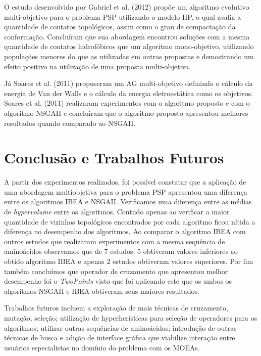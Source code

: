 \documentclass[conference]{IEEEtran}
\begin{document}
O estudo desenvolvido por Gabriel et al. (2012) \cite{gabriel2012algoritmos} propõe um algoritmo evolutivo multi-objetivo para o problema PSP utilizando o modelo HP, o qual avalia a
quantidade de contatos topológicos, assim como o grau de
compactação da conformação. Concluíram que sua abordagem
encontrou soluções com a mesma quantidade de contatos
hidrofóbicos que um algoritmo mono-objetivo, utilizando
populações menores do que as utilizadas em outras propostas
e demostrando um efeito positivo na utilização
de uma proposta multi-objetiva.

Já Soares et al. (2011) \cite{soares2011investigating} propuseram um AG multi-objetivo definindo o cálculo da energia de Van der Walls e o cálculo da energia eletroestática como os objetivos. Soares et al. (2011) realizaram experimentos com o algoritmo proposto e com o algoritmo NSGAII \cite{deb2002fast} e concluiram que o algoritmo proposto apresentou melhores resultados quando comparado ao NSGAII. 




\section{Conclusão e Trabalhos Futuros}

A partir dos experimentos realizados, foi possível constatar
que a aplicação de uma abordagem multiobjetiva para o problema PSP apresentou uma diferença entre os algoritmos IBEA e NSGAII. Verificamos uma diferença entre as médias de \textit{hypervolume} entre os algoritmos. Contudo apenas ao verificar a maior quantidade de vizinhos topológicos encontrados por cada algoritmo ficou nítida a diferença no desempenho dos algoritmos. Ao comparar o algoritmo IBEA com outros estudos que realizaram experimentos com a mesma sequência de aminoácidos observamos que de 7 estudos: 5 obtiveram valores inferiores ao obtido algoritmo IBEA e apenas 2 estudos obtiveram valores superiores. Por fim também concluímos que operador de cruzamento que apresentou melhor desempenho foi o \textit{TwoPoints} visto que foi aplicando este que os ambos os algoritmos NSGAII e IBEA obtiveram seus maiores resultados. 

Trabalhos futuros incluem a exploração de mais técnicas de cruzamento, mutação, seleção; utilização de hyperherísticas para seleção de operadores para os algoritmos; utilizar  outras sequências de aminoácidos;  introdução de outras técnicas de busca e adição de interface gráfica que viabilize interação entre usuários especialistas no domínio do problema com os MOEAs. 
\end{document}
